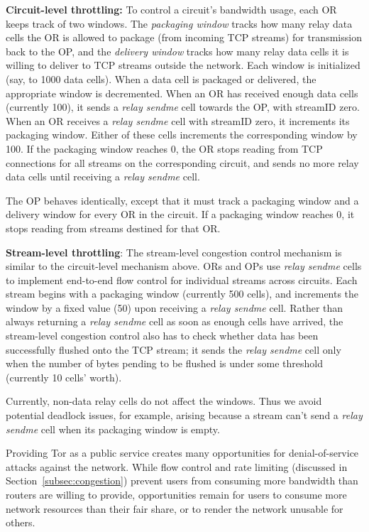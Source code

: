 \documentclass[times,10pt,twocolumn]{article}
\begin{document}
\textbf{Circuit-level throttling:}
To control a circuit's bandwidth usage, each OR keeps track of two
windows. The \emph{packaging window} tracks how many relay data cells the OR is
allowed to package (from incoming TCP streams) for transmission back to the OP,
and the \emph{delivery window} tracks how many relay data cells it is willing
to deliver to TCP streams outside the network. Each window is initialized
(say, to 1000 data cells). When a data cell is packaged or delivered,
the appropriate window is decremented. When an OR has received enough
data cells (currently 100), it sends a \emph{relay sendme} cell towards the OP,
with streamID zero. When an OR receives a \emph{relay sendme} cell with
streamID zero, it increments its packaging window. Either of these cells
increments the corresponding window by 100. If the packaging window
reaches 0, the OR stops reading from TCP connections for all streams
on the corresponding circuit, and sends no more relay data cells until
receiving a \emph{relay sendme} cell.

The OP behaves identically, except that it must track a packaging window
and a delivery window for every OR in the circuit. If a packaging window
reaches 0, it stops reading from streams destined for that OR.

\textbf{Stream-level throttling}:
The stream-level congestion control mechanism is similar to the
circuit-level mechanism above. ORs and OPs use \emph{relay sendme} cells
to implement end-to-end flow control for individual streams across
circuits. Each stream begins with a packaging window (currently 500 cells),
and increments the window by a fixed value (50) upon receiving a \emph{relay
sendme} cell. Rather than always returning a \emph{relay sendme} cell as soon
as enough cells have arrived, the stream-level congestion control also
has to check whether data has been successfully flushed onto the TCP
stream; it sends the \emph{relay sendme} cell only when the number of bytes pending
to be flushed is under some threshold (currently 10 cells' worth).

Currently, non-data relay cells do not affect the windows. Thus we
avoid potential deadlock issues, for example, arising because a stream
can't send a \emph{relay sendme} cell when its packaging window is empty.


\label{subsec:dos}

Providing Tor as a public service creates many opportunities for
denial-of-service attacks against the network.  While
flow control and rate limiting (discussed in
Section~\ref{subsec:congestion}) prevent users from consuming more
bandwidth than routers are willing to provide, opportunities remain for
users to
consume more network resources than their fair share, or to render the
network unusable for others.
\end{document}
